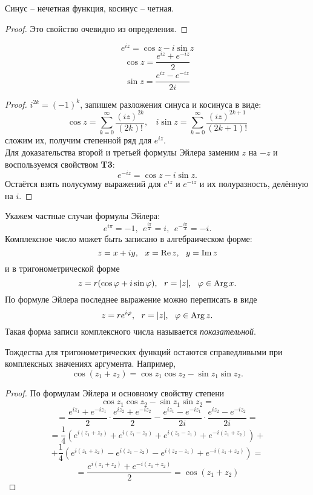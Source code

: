 \begin{Thm}[Т3]
    Синус -- нечетная функция, косинус -- четная.
\end{Thm}

\begin{proof}
    Это свойство очевидно из определения.
\end{proof}

\begin{Thm}
    $$e^{iz} = \cos z - i\sin z$$
    $$\cos z = \frac{e^{iz} + e^{-iz}}{2}$$
    $$\sin z = \frac{e^{iz} - e^{-iz}}{2i}$$
\end{Thm}

\begin{proof}
    $i^{2k} = (-1)^k$, запишем разложения синуса и косинуса в виде:
    $$\cos z = \sum_{k = 0}^{\infty} \frac{(iz)^{2k}}{(2k)!}, \ \ \ \ i\sin z = \sum_{k = 0}^{\infty} \frac{(iz)^{2k + 1}}{(2k + 1)!}$$
    сложим их, получим степенной ряд для $e^{iz}$.\\
    Для доказательства второй и третьей формулы Эйлера заменим $z$ на $-z$ и воспользуемся свойством \textbf{T3}:
    $$e^{-iz} = \cos z - i\sin z.$$
    Остаётся взять полусумму выражений для $e^{iz}$ и $e^{-iz}$ и их полуразность, делённую на $i$.
\end{proof}

\begin{Rem}
    Укажем частные случаи формулы Эйлера:
    \[ e^{i\pi} = -1, \ \ e^{ \frac{i\pi}{2}} =i, \ \ e^{-\frac{i\pi}{2}} = -i.\]
    Комплексное число может быть записано в алгебраическом форме:
    \[ z = x + iy, \ \ x = \operatorname{Re} z, \ \ y = \operatorname{Im} z\]
    и в тригонометрической форме 
    \[ z = r(\cos \varphi + i \sin \varphi), \ \ r = |z|, \ \ \varphi \in \operatorname{Arg} x.\]
    По формуле Эйлера последнее выражение можно переписать в виде
    \[ z = re^{i\varphi}, \ \ r = |z|, \ \ \varphi \in \Arg z. \]
    Такая форма записи комплексного числа называется \textit{показательной}. 
\end{Rem}

\begin{Thm}[Т5]
    Тождества для тригонометрических функций остаются справедливыми при комплексных значениях аргумента.
    Например, $$\cos(z_1 +z_2) = \cos z_1 \cos z_2 - \sin z_1 \sin z_2.$$
\end{Thm}

\begin{proof}
    По формулам Эйлера и основному свойству степени
    $$\cos z_1 \cos z_2 - \sin z_1 \sin z_2 = $$
    $$= \frac{e^{iz_1} +e^{-iz_1}}{2} \cdot \frac{e^{iz_2} + e^{-iz_2}}{2} - \frac{e^{iz_1} - e^{-iz_1}}{2i} \cdot \frac{e^{iz_2} - e^{-iz_2}}{2i} =$$
    $$= \frac{1}{4} \left( e^{i(z_1 + z_2)} + e^{i(z_1 - z_2)} + e^{i(z_2 - z_1)} + e^{-i(z_1 + z_2)} \right) +$$
    $$+ \frac{1}{4} \left( e^{i(z_1 + z_2)} - e^{i(z_1 - z_2)} - e^{i(z_2 - z_1)} + e^{-i(z_1 + z_2)} \right) =$$
    $$= \frac{e^{i(z_1 + z_2)} + e^{-i(z_1 + z_2)}}{2} = \cos(z_1 + z_2)$$
\end{proof}

